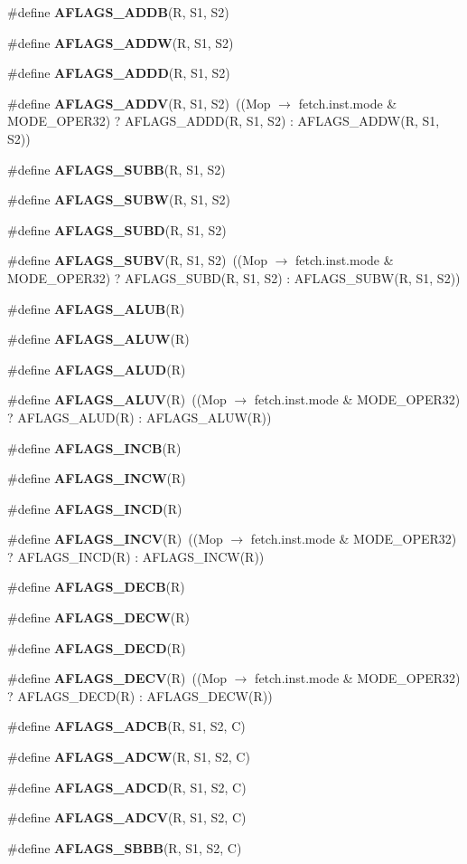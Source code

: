 \begin{CompactItemize}
\#define {\bf AFLAGS\_\-ADDB}(R, S1, S2)
\item 
\#define {\bf AFLAGS\_\-ADDW}(R, S1, S2)
\item 
\#define {\bf AFLAGS\_\-ADDD}(R, S1, S2)
\item 
\#define {\bf AFLAGS\_\-ADDV}(R, S1, S2)~((Mop $\rightarrow$ fetch.inst.mode \& MODE\_\-OPER32) ? AFLAGS\_\-ADDD(R, S1, S2) : AFLAGS\_\-ADDW(R, S1, S2))
\item 
\#define {\bf AFLAGS\_\-SUBB}(R, S1, S2)
\item 
\#define {\bf AFLAGS\_\-SUBW}(R, S1, S2)
\item 
\#define {\bf AFLAGS\_\-SUBD}(R, S1, S2)
\item 
\#define {\bf AFLAGS\_\-SUBV}(R, S1, S2)~((Mop $\rightarrow$ fetch.inst.mode \& MODE\_\-OPER32) ? AFLAGS\_\-SUBD(R, S1, S2) : AFLAGS\_\-SUBW(R, S1, S2))
\item 
\#define {\bf AFLAGS\_\-ALUB}(R)
\item 
\#define {\bf AFLAGS\_\-ALUW}(R)
\item 
\#define {\bf AFLAGS\_\-ALUD}(R)
\item 
\#define {\bf AFLAGS\_\-ALUV}(R)~((Mop $\rightarrow$ fetch.inst.mode \& MODE\_\-OPER32) ? AFLAGS\_\-ALUD(R) : AFLAGS\_\-ALUW(R))
\item 
\#define {\bf AFLAGS\_\-INCB}(R)
\item 
\#define {\bf AFLAGS\_\-INCW}(R)
\item 
\#define {\bf AFLAGS\_\-INCD}(R)
\item 
\#define {\bf AFLAGS\_\-INCV}(R)~((Mop $\rightarrow$ fetch.inst.mode \& MODE\_\-OPER32) ? AFLAGS\_\-INCD(R) : AFLAGS\_\-INCW(R))
\item 
\#define {\bf AFLAGS\_\-DECB}(R)
\item 
\#define {\bf AFLAGS\_\-DECW}(R)
\item 
\#define {\bf AFLAGS\_\-DECD}(R)
\item 
\#define {\bf AFLAGS\_\-DECV}(R)~((Mop $\rightarrow$ fetch.inst.mode \& MODE\_\-OPER32) ? AFLAGS\_\-DECD(R) : AFLAGS\_\-DECW(R))
\item 
\#define {\bf AFLAGS\_\-ADCB}(R, S1, S2, C)
\item 
\#define {\bf AFLAGS\_\-ADCW}(R, S1, S2, C)
\item 
\#define {\bf AFLAGS\_\-ADCD}(R, S1, S2, C)
\item 
\#define {\bf AFLAGS\_\-ADCV}(R, S1, S2, C)
\item 
\#define {\bf AFLAGS\_\-SBBB}(R, S1, S2, C)
\item 

\end{CompactItemize}
